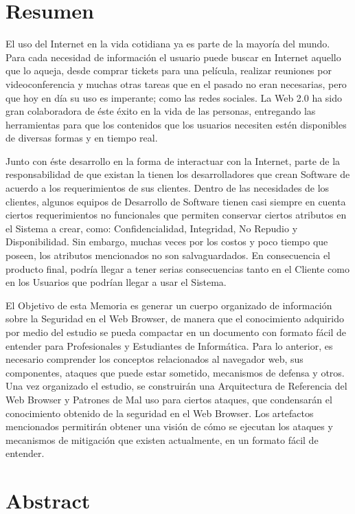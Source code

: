 
\section*{Resumen}
\label{chap:resumen}

El uso del Internet en la vida cotidiana ya es parte de la mayoría del mundo. Para cada necesidad de información el usuario puede buscar en Internet aquello que lo aqueja, desde comprar tickets para una película, realizar reuniones por videoconferencia y muchas otras tareas que en el pasado no eran necesarias, pero que hoy en día su uso es imperante; como las redes sociales. La Web 2.0 ha sido gran colaboradora de éste éxito en la vida de las personas, entregando las herramientas para que los contenidos que los usuarios necesiten estén disponibles de diversas formas y en tiempo real.

Junto con éste desarrollo en la forma de interactuar con la Internet, parte de la responsabilidad de que existan la tienen los desarrolladores que crean Software de acuerdo a los requerimientos de sus clientes. Dentro de las necesidades de los clientes, algunos equipos de Desarrollo de Software tienen casi siempre en cuenta ciertos requerimientos no funcionales que permiten conservar ciertos atributos en el Sistema a crear, como: Confidencialidad, Integridad, No Repudio y Disponibilidad. Sin embargo, muchas veces por los costos y poco tiempo que poseen, los atributos mencionados no son salvaguardados. En consecuencia el producto final, podría llegar a tener serias consecuencias tanto en el Cliente como en los Usuarios que podrían llegar a usar el Sistema.

El Objetivo de esta Memoria es generar un cuerpo organizado de información sobre la Seguridad en el Web Browser, de manera que el conocimiento adquirido por medio del estudio se pueda compactar en un documento con formato fácil de entender para Profesionales y Estudiantes de Informática. Para lo anterior, es necesario comprender los conceptos relacionados al navegador web, sus componentes, ataques que puede estar sometido, mecanismos de defensa y otros. Una vez organizado el estudio, se construirán una Arquitectura de Referencia del Web Browser y Patrones de Mal uso para ciertos ataques, que condensarán el conocimiento obtenido de la seguridad en el Web Browser. Los artefactos mencionados permitirán obtener una visión de cómo se ejecutan los ataques y mecanismos de mitigación que existen actualmente, en un formato fácil de entender.


\section*{Abstract}
\label{chap:abstract}

